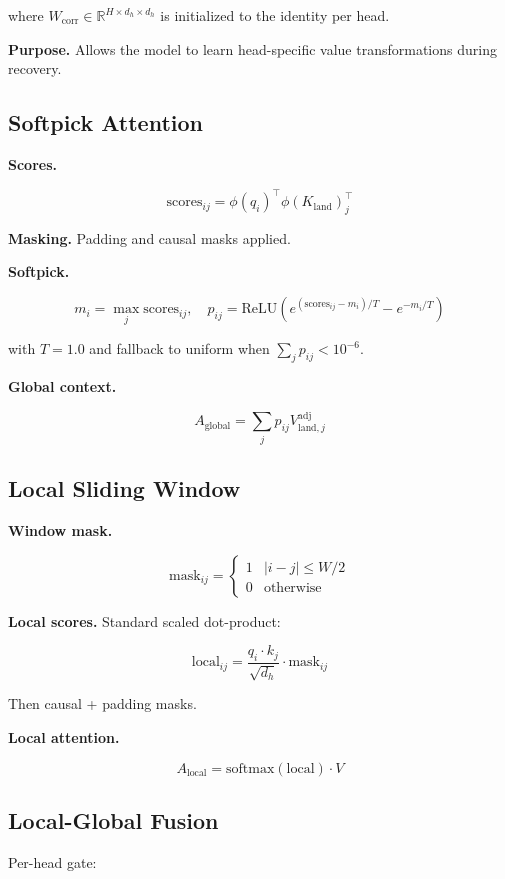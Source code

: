 where $W_\text{corr} \in \mathbb{R}^{H \times d_h \times d_h}$ is 
initialized to the identity per head.

\textbf{Purpose.} Allows the model to learn head-specific value transformations 
during recovery.

\subsection{Softpick Attention}

\textbf{Scores.}

\[
\text{scores}_{ij} = \phi(q_i)^\top \phi(K_\text{land})_j^\top
\tag{4.7}
\]

\textbf{Masking.} Padding and causal masks applied.

\textbf{Softpick.}

\[
m_i = \max_j \text{scores}_{ij}, \quad
p_{ij} = \text{ReLU}\!\left(e^{(\text{scores}_{ij} - m_i)/T} - e^{-m_i/T}\right)
\tag{4.8}
\]

with $T = 1.0$ and fallback to uniform when $\sum_j p_{ij} < 10^{-6}$.

\textbf{Global context.}

\[
A_\text{global} = \sum_j p_{ij} V_{\text{land}, j}^\text{adj}
\tag{4.9}
\]

\subsection{Local Sliding Window}

\textbf{Window mask.}

\[
\text{mask}_{ij} = \begin{cases} 1 & |i - j| \leq W/2 \\ 0 & \text{otherwise} \end{cases}
\tag{4.10}
\]

\textbf{Local scores.} Standard scaled dot-product:

\[
\text{local}_{ij} = \frac{q_i \cdot k_j}{\sqrt{d_h}} \cdot \text{mask}_{ij}
\tag{4.11}
\]

Then causal + padding masks.

\textbf{Local attention.}

\[
A_\text{local} = \text{softmax}(\text{local}) \cdot V
\tag{4.12}
\]

\subsection{Local-Global Fusion}

Per-head gate:

